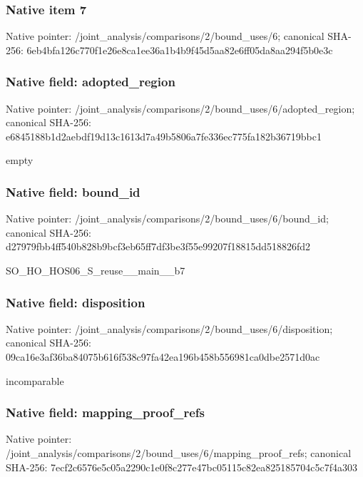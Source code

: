 \documentclass[10pt,a4paper]{article}
\begin{document}
\subsubsection{Native item 7}
Native pointer: /joint\_\allowbreak{}analysis/comparisons/2/bound\_\allowbreak{}uses/6; canonical SHA-256: 6eb4bfa126c770f1e26e8ca1ee36a1b4b9f45d5aa82e6ff05da8aa294f5b0e3c

\subsubsection{Native field: adopted\_\allowbreak{}region}
Native pointer: /joint\_\allowbreak{}analysis/comparisons/2/bound\_\allowbreak{}uses/6/adopted\_\allowbreak{}region; canonical SHA-256: e6845188b1d2aebdf19d13c1613d7a49b5806a7fe336ec775fa182b36719bbc1

\begingroup\raggedright\sloppy empty\par\endgroup

\subsubsection{Native field: bound\_\allowbreak{}id}
Native pointer: /joint\_\allowbreak{}analysis/comparisons/2/bound\_\allowbreak{}uses/6/bound\_\allowbreak{}id; canonical SHA-256: d27979fbb4ff540b828b9bcf3eb65ff7df3be3f55e99207f18815dd518826fd2

\begingroup\raggedright\sloppy SO\_\allowbreak{}HO\_\allowbreak{}HOS06\_\allowbreak{}S\_\allowbreak{}reuse\_\allowbreak{}\_\allowbreak{}main\_\allowbreak{}\_\allowbreak{}b7\par\endgroup

\subsubsection{Native field: disposition}
Native pointer: /joint\_\allowbreak{}analysis/comparisons/2/bound\_\allowbreak{}uses/6/disposition; canonical SHA-256: 09ca16e3af36ba84075b616f538c97fa42ea196b458b556981ca0dbe2571d0ac

\begingroup\raggedright\sloppy incomparable\par\endgroup

\subsubsection{Native field: mapping\_\allowbreak{}proof\_\allowbreak{}refs}
Native pointer: /joint\_\allowbreak{}analysis/comparisons/2/bound\_\allowbreak{}uses/6/mapping\_\allowbreak{}proof\_\allowbreak{}refs; canonical SHA-256: 7ecf2c6576e5c05a2290c1e0f8c277e47bc05115c82ea825185704c5c7f4a303
\end{document}
